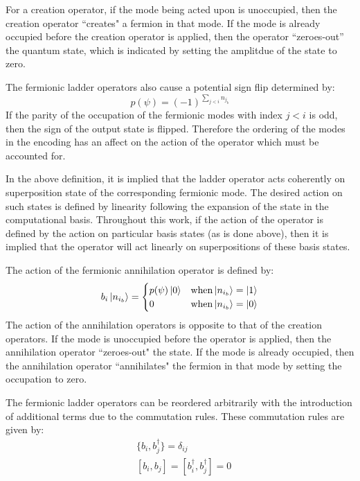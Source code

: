For a creation operator, if the mode being acted upon is unoccupied, then the creation operator ``creates" a fermion in that mode.
If the mode is already occupied before the creation operator is applied, then the operator ``zeroes-out'' the quantum state, which is indicated by setting the amplitdue of the state to zero.

The fermionic ladder operators also cause a potential sign flip determined by:
\begin{equation}
    \label{eq:parity}
    p(\psi) = (-1)^{\sum_{j < i} n_{j_b}}
\end{equation}
If the parity of the occupation of the fermionic modes with index $j < i$ is odd, then the sign of the output state is flipped.
Therefore the ordering of the modes in the encoding has an affect on the action of the operator which must be accounted for.

In the above definition, it is implied that the ladder operator acts coherently on superposition state of the corresponding fermionic mode.
The desired action on such states is defined by linearity following the expansion of the state in the computational basis.
Throughout this work, if the action of the operator is defined by the action on particular basis states (as is done above), then it is implied that the operator will act linearly on superpositions of these basis states. 

The action of the fermionic annihilation operator is defined by:
\begin{equation}
    \label{eq:fermionic-annihilation}
    b_i \ket{n_{i_b}} = 
    \begin{cases} 
        p(\psi) \ket{0}  & {\rm when} \ket{n_{i_b}} = \ket{1} \\
        0 & {\rm when} \ket{n_{i_b}} = \ket{0}
    \end{cases}
\end{equation}
The action of the annihilation operators is opposite to that of the creation operators.
If the mode is unoccupied before the operator is applied, then the annihilation operator ``zeroes-out" the state.
If the mode is already occupied, then the annihilation operator ``annihilates" the fermion in that mode by setting the occupation to zero.

The fermionic ladder operators can be reordered arbitrarily with the introduction of additional terms due to the commutation rules.
These commutation rules are given by:
\begin{equation}
    \label{eq:fermionic-commutation}
    \begin{split}
        &\{b_i, b_j^\dagger\} = \delta_{ij}\\
        & [b_i, b_j] = [b_i^\dagger, b_j^\dagger] = 0 \\
    \end{split}
\end{equation}

